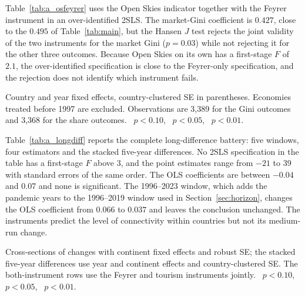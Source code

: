 Table~\ref{tab:a_osfeyrer} uses the Open Skies indicator together with the Feyrer instrument in an over-identified 2SLS. The market-Gini coefficient is $0.427$, close to the $0.495$ of Table~\ref{tab:main}, but the Hansen $J$ test rejects the joint validity of the two instruments for the market Gini ($p=0.03$) while not rejecting it for the other three outcomes. Because Open Skies on its own has a first-stage $F$ of $2.1$, the over-identified specification is close to the Feyrer-only specification, and the rejection does not identify which instrument fails.

\begin{table}[H]\centering\caption{Over-identified 2SLS with the Open Skies indicator and the Feyrer instrument.}\label{tab:a_osfeyrer}
\begin{threeparttable}\small
\begin{tablenotes}\footnotesize\item Country and year fixed effects, country-clustered SE in parentheses. Economies treated before 1997 are excluded. Observations are 3,389 for the Gini outcomes and 3,368 for the share outcomes. \sym{*}~$p<0.10$, \sym{**}~$p<0.05$, \sym{***}~$p<0.01$.\end{tablenotes}\end{threeparttable}\end{table}

Table~\ref{tab:a_longdiff} reports the complete long-difference battery: five windows, four estimators and the stacked five-year differences. No 2SLS specification in the table has a first-stage $F$ above $3$, and the point estimates range from $-21$ to $39$ with standard errors of the same order. The OLS coefficients are between $-0.04$ and $0.07$ and none is significant. The 1996--2023 window, which adds the pandemic years to the 1996--2019 window used in Section~\ref{sec:horizon}, changes the OLS coefficient from $0.066$ to $0.037$ and leaves the conclusion unchanged. The instruments predict the level of connectivity within countries but not its medium-run change.

\begin{table}[H]\centering\caption{Long differences and stacked differences, complete battery.}\label{tab:a_longdiff}
\begin{threeparttable}\small
\begin{tablenotes}\footnotesize\item Cross-sections of changes with continent fixed effects and robust SE; the stacked five-year differences use year and continent effects and country-clustered SE. The both-instrument rows use the Feyrer and tourism instruments jointly. \sym{*}~$p<0.10$, \sym{**}~$p<0.05$, \sym{***}~$p<0.01$.\end{tablenotes}\end{threeparttable}\end{table}

